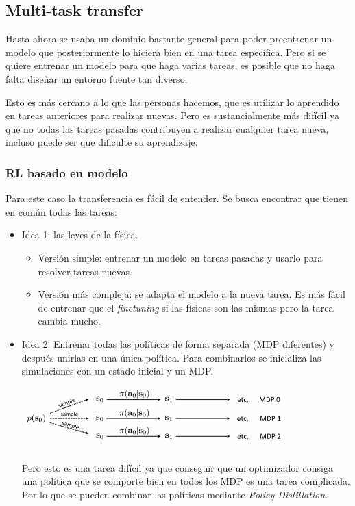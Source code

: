 \subsection{Multi-task transfer}%
\label{sub:multi_task_transfer}

Hasta ahora se usaba un dominio bastante general para poder preentrenar un modelo que
posteriormente lo hiciera bien en una tarea específica. Pero si se quiere entrenar un modelo
para que haga varias tareas, es posible que no haga falta diseñar un entorno fuente tan diverso.

Esto es más cercano a lo que las personas hacemos, que es utilizar lo aprendido en tareas
anteriores para realizar nuevas. Pero es sustancialmente más difícil ya que no todas las tareas
pasadas contribuyen a realizar cualquier tarea nueva, incluso puede ser que dificulte su
aprendizaje.

\subsubsection{RL basado en modelo}%
\label{ssub:rl_basado_en_modelo}

Para este caso la transferencia es fácil de entender. Se busca encontrar que tienen en común
todas las tareas:
\begin{itemize}
    \item Idea 1: las leyes de la física.
        \begin{itemize}
            \item Versión simple: entrenar un modelo en tareas pasadas y usarlo para resolver
                tareas nuevas.
            \item Versión más compleja: se adapta el modelo a la nueva tarea. Es más fácil
                de entrenar que el \textit{finetuning} si las físicas son las mismas pero la
                tarea cambia mucho.
        \end{itemize}
    \item Idea 2: Entrenar todas las políticas de forma separada (MDP diferentes) y después
        unirlas en una única política. Para combinarlos se inicializa las simulaciones con un estado
        inicial y un MDP.
\begin{center}
\includegraphics[width=0.8\textwidth]{figures/2020-07-12-195346_732x170_scrot.png}
\end{center}
    Pero esto es una tarea difícil ya que conseguir que un optimizador consiga una
    política que se comporte bien en todos los MDP es una tarea complicada. Por lo que se
    pueden combinar las políticas mediante \textit{Policy Distillation}.
\end{itemize}

